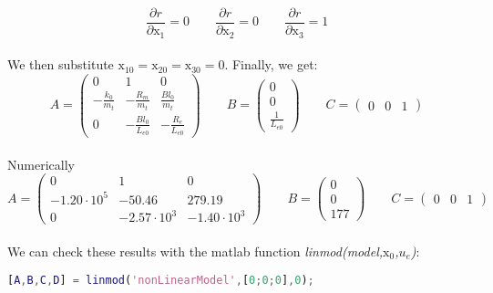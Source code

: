 \begin{equation*}
\frac{\partial{r}}{\partial{\text{x}_{1}}} = 0 \qquad 
\frac{\partial{r}}{\partial{\text{x}_{2}}} = 0 \qquad
\frac{\partial{r}}{\partial{\text{x}_{3}}} = 1
\end{equation*}\\
We then substitute $\text{x}_{10} = \text{x}_{20} = \text{x}_{30} = 0$.
Finally, we get:
\begin{equation*} A = \begin{pmatrix}
   0 & 1 & 0 \\
   -\frac{k_0}{m_t} & -\frac{R_m}{m_t} & \frac{Bl_0}{m_t} \\
  0 & - \frac{Bl_0}{L_{e0}} & - \frac{R_e}{L_{e0}}  
\end{pmatrix}
\qquad B = \begin{pmatrix}
0 \\
0 \\
\frac{1}{L_{e0}}
\end{pmatrix}
\qquad C = \begin{pmatrix}
	0 & 0 & 1 
\end{pmatrix}
\end{equation*}\\
Numerically
\begin{equation} A = \begin{pmatrix}
   0 & 1 & 0 \\
  -1.20 \cdot 10^5 & -50.46 & 279.19 \\
  0 & -2.57 \cdot 10^3 & -1.40 \cdot 10^3
\end{pmatrix}
\qquad B = \begin{pmatrix}
0 \\
0 \\
177
\end{pmatrix}
\qquad C = \begin{pmatrix}
	0 & 0 & 1 
\end{pmatrix}
\label{eq:AandB}
\end{equation}\\
We can check these results with the matlab function \textit{linmod(model,$\text{x}_0$,$u_e$)}:
\vspace*{-0.5cm}
\begin{lstlisting}[language=Matlab]
[A,B,C,D] = linmod('nonLinearModel',[0;0;0],0);
\end{lstlisting}